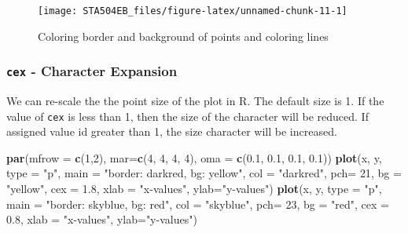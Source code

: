 \documentclass[
]{book}
\newenvironment{Shaded}{\begin{snugshade}}{\end{snugshade}}
\newcommand{\AttributeTok}[1]{\textcolor[rgb]{0.13,0.29,0.53}{#1}}
\newcommand{\DecValTok}[1]{\textcolor[rgb]{0.00,0.00,0.81}{#1}}
\newcommand{\FloatTok}[1]{\textcolor[rgb]{0.00,0.00,0.81}{#1}}
\newcommand{\FunctionTok}[1]{\textcolor[rgb]{0.13,0.29,0.53}{\textbf{#1}}}
\newcommand{\NormalTok}[1]{#1}
\newcommand{\StringTok}[1]{\textcolor[rgb]{0.31,0.60,0.02}{#1}}
\begin{document}
\begin{figure}

{\centering \texttt{[image: STA504EB\_files/figure-latex/unnamed-chunk-11-1]} 

}

\caption{Coloring border and background of points and coloring lines}\label{fig:unnamed-chunk-11}
\end{figure}

\hypertarget{cex---character-expansion}{%
\subsubsection{\texorpdfstring{\texttt{cex} - Character Expansion}{cex - Character Expansion}}\label{cex---character-expansion}}

We can re-scale the the point size of the plot in R. The default size is 1. If the value of \texttt{cex} is less than 1, then the size of the character will be reduced. If assigned value id greater than 1, the size character will be increased.

\begin{Shaded}
\begin{Highlighting}[]
\FunctionTok{par}\NormalTok{(}\AttributeTok{mfrow =} \FunctionTok{c}\NormalTok{(}\DecValTok{1}\NormalTok{,}\DecValTok{2}\NormalTok{), }\AttributeTok{mar=}\FunctionTok{c}\NormalTok{(}\DecValTok{4}\NormalTok{, }\DecValTok{4}\NormalTok{, }\DecValTok{4}\NormalTok{, }\DecValTok{4}\NormalTok{), }\AttributeTok{oma =} \FunctionTok{c}\NormalTok{(}\FloatTok{0.1}\NormalTok{, }\FloatTok{0.1}\NormalTok{, }\FloatTok{0.1}\NormalTok{, }\FloatTok{0.1}\NormalTok{))}
\FunctionTok{plot}\NormalTok{(x, y, }\AttributeTok{type =} \StringTok{"p"}\NormalTok{, }\AttributeTok{main =} \StringTok{"border: darkred, bg: yellow"}\NormalTok{, }\AttributeTok{col =} \StringTok{"darkred"}\NormalTok{, }\AttributeTok{pch=} \DecValTok{21}\NormalTok{,  }
     \AttributeTok{bg =} \StringTok{"yellow"}\NormalTok{, }\AttributeTok{cex =} \FloatTok{1.8}\NormalTok{, }\AttributeTok{xlab =} \StringTok{"x{-}values"}\NormalTok{, }\AttributeTok{ylab=}\StringTok{"y{-}values"}\NormalTok{)}
\FunctionTok{plot}\NormalTok{(x, y, }\AttributeTok{type =} \StringTok{"p"}\NormalTok{, }\AttributeTok{main =} \StringTok{"border: skyblue, bg: red"}\NormalTok{,  }\AttributeTok{col =} \StringTok{"skyblue"}\NormalTok{, }\AttributeTok{pch=} \DecValTok{23}\NormalTok{,  }
     \AttributeTok{bg =} \StringTok{"red"}\NormalTok{, }\AttributeTok{cex =} \FloatTok{0.8}\NormalTok{,  }\AttributeTok{xlab =} \StringTok{"x{-}values"}\NormalTok{, }\AttributeTok{ylab=}\StringTok{"y{-}values"}\NormalTok{)}
\end{Highlighting}
\end{Shaded}
\end{document}

